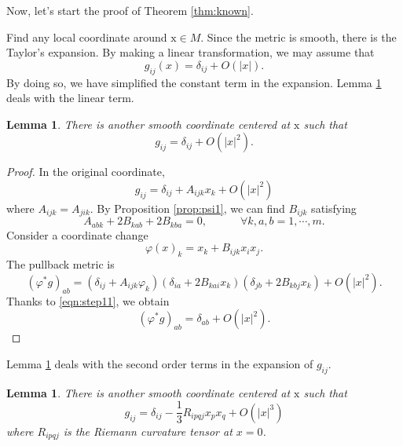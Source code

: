 \documentclass{amsart}
\newtheorem{lem}[thm]{Lemma}
\newcommand{\abs}[1]{\left\vert#1\right\vert}
\newcommand{\bx}{\mathrm{x}}
\numberwithin{equation}{section}
\begin{document}
Now, let's start the proof of Theorem \ref{thm:known}. 

Find any local coordinate around $\bx\in M$. Since the metric is smooth, there is the Taylor's expansion. By making a linear transformation, we may assume that
\[
	g_{ij}(x)= \delta_{ij}+ O(\abs{x}).
\]
By doing so, we have simplified the constant term in the expansion. Lemma \ref{lem:prealgebra} deals with the linear term.
\begin{lem}
	\label{lem:prealgebra} There is another smooth coordinate centered at $\bx$ such that
	\begin{equation}
		\label{eqn:prealgebra}
		g_{ij}= \delta_{ij}+ O(\abs{x}^2).
	\end{equation}
\end{lem}
\begin{proof}
	In the original coordinate,
	\begin{equation}
		\label{eqn:step1ass}
		g_{ij}=\delta_{ij}+A_{ijk}x_k + O(\abs{x}^2)
	\end{equation}
	where $A_{ijk}=A_{jik}$.
	By Proposition  \ref{prop:psi1}, we can find $B_{ijk}$ satisfying
	\begin{equation}
		\label{eqn:step11}
		A_{abk}+2B_{kab}+2B_{kba}=0, \qquad \text{} \quad \forall k,a,b=1,\cdots ,m.
	\end{equation}
	Consider a coordinate change
	\[
		\varphi(x)_k = x_k + B_{ijk}x_ix_j.
	\]
	The pullback metric is
	\[
		(\varphi^* g)_{ab}= \left( \delta_{ij}+A_{ijk}\varphi_k \right) \left( \delta_{ia}+2B_{kai}x_k \right)\left( \delta_{jb}+ 2B_{kbj}x_k\right)+  O(\abs{x}^2).
	\]
	Thanks to \eqref{eqn:step11}, we obtain
	\[
		(\varphi^* g)_{ab}= \delta_{ab} + O(\abs{x}^2).
	\]
\end{proof}


Lemma \ref{lem:algebra} deals with the second order terms in the expansion of $g_{ij}$.
\begin{lem}
	\label{lem:algebra}
	There is another smooth coordinate centered at $\bx$ such that
	\[
		g_{ij}=\delta_{ij}- \frac{1}{3}R_{ipqj} x_px_q + O(\abs{x}^3)
	\]
	where $R_{ipqj}$ is the Riemann curvature tensor at $x=0$. 
\end{lem}
\end{document}
